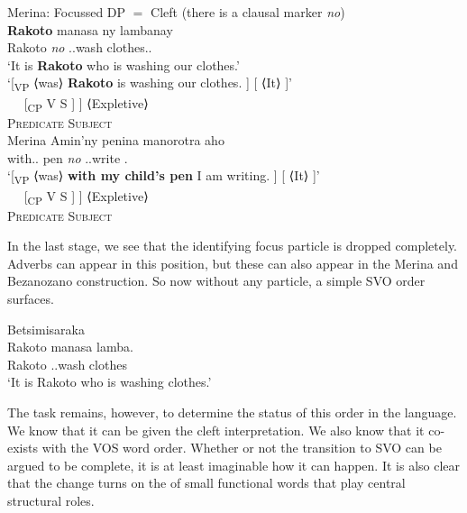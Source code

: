 \documentclass[output=paper]{langsci/langscibook}
\begin{document}
\ea Merina: Focussed DP $=$ Cleft (there is a clausal marker \emph{no})\\
       \ea
    \gll  \textbf{Rakoto}  manasa ny lambanay\\
    Rakoto \emph{no} \Prs.\At{}.wash \Det{} clothes.\Fpl.\Excl{}\\
    \glt `It is \textbf{Rakoto} who is washing our clothes.'  \\
    \glt `[\textsubscript{VP} ⟨was⟩ \textbf{Rakoto}  is washing our clothes. ] [ ⟨It⟩ ]' \\
    \ex
    \gll {$[$\textsubscript{VP} ⟨\Cop{⟩} DP} {~~} {[\textsubscript{CP}  V} {S ] ] ⟨Expletive⟩}\\
        {\textsc{Predicate}} {} {} \textsc{Subject}\\
    \z
\ex  Merina
    \ea
    \gll Amin'ny penina  manorotra aho\\
    with.\Gen{}.\Det{} pen \emph{no} \Prs.\At{}.write \Fsg{}.\Nom{}\\
    \glt `[\textsubscript{VP} ⟨was⟩ \textbf{with my child's pen}  I am writing. ] [ ⟨It⟩ ]' \\
    \ex
    \gll {$[$\textsubscript{VP} ⟨\Cop⟩ PP} {~~} {[\textsubscript{CP}  V} {S ] ] ⟨Expletive⟩}\\
    \textsc{Predicate} {} {} \textsc{Subject}\\
    \z
\z

In the last stage, we see that the identifying focus particle is dropped
completely.  Adverbs can appear in this position, but these  can also
appear in the Merina and Bezanozano construction.  So now without any particle,
a simple SVO order surfaces.

\ea Betsimisaraka\\
	\gll  Rakoto manasa lamba.\\
    Rakoto \Prs.\At{}.wash clothes\\
    \glt `It is Rakoto who is washing clothes.'
\z

The task remains, however, to determine the status of this order in the
language.  We know that it can be given the cleft interpretation.  We also know
that it co-exists with the VOS word order.  Whether or not the transition to
SVO can be argued to be complete, it is at least imaginable how it can happen.
It is also clear that the change turns on the  of small functional
words that play central structural roles.
\end{document}
